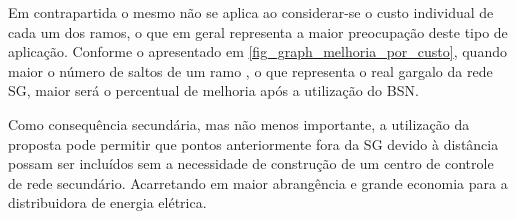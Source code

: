\documentclass[conference]{IEEEtran}
\begin{document}
Em contrapartida o mesmo não se aplica ao considerar-se o custo individual de cada um dos ramos, o que em geral representa a maior preocupação deste tipo de aplicação. Conforme o apresentado em \ref{fig_graph_melhoria_por_custo}, quando maior o número de saltos de um ramo , o que representa o real gargalo da rede SG, maior será o percentual de melhoria após a utilização do BSN.

Como consequência secundária, mas não menos importante, a utilização da proposta pode permitir que pontos anteriormente fora da SG devido à distância possam ser incluídos sem a necessidade de construção de um centro de controle de rede secundário. Acarretando em maior abrangência e grande economia para a distribuidora de energia elétrica.





\end{document}
